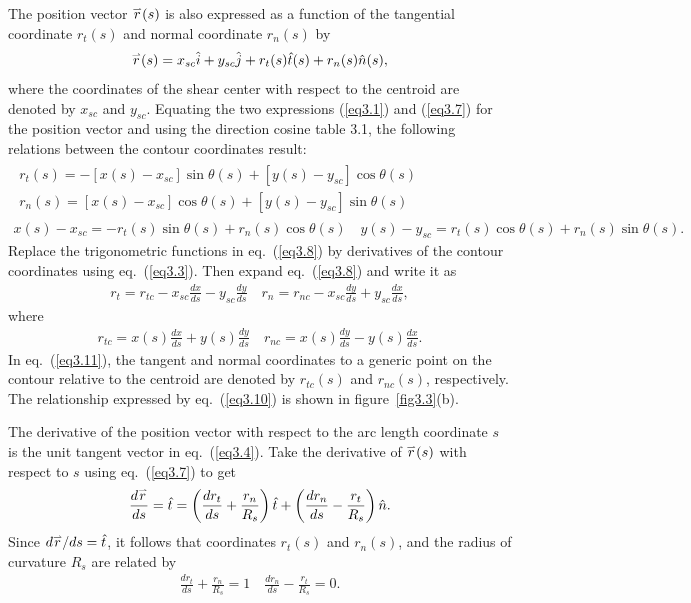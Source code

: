 \documentclass{AeroStructure-ERJohnson}
\def\harp#1{\smash{\mathord{\buildrel{\lower3pt\hbox{$\scriptscriptstyle\rightharpoonup$}}\over{#1}}}}
\begin{document}
The position vector $\harp{r}(s)$ is also expressed as a function of the tangential coordinate $r_{t}(s)$ and normal coordinate $r_{n}(s)$ by
\begin{align}\label{eq3.7}
\harp{r}(s)=x_{s c} \hat{i}+y_{sc} \hat{j}+r_{t}(s) \hat{t}(s)+r_{n}(s) \hat{n}(s),
\end{align}
where the coordinates of the shear center with respect to the centroid are denoted by $x_{s c}$ and $y_{s c}$. Equating the two expressions (\ref{eq3.1}) and (\ref{eq3.7}) for the position vector and using the direction cosine table 3.1, the following relations between the contour coordinates result:
\begin{gather}\label{eq3.8}
\begin{split}
r_{t}(s)=-\left[x(s)-x_{s c}\right] \sin \theta(s)+\left[y(s)-y_{s c}\right] \cos \theta(s) \\
r_{n}(s)=\left[x(s)-x_{s c}\right] \cos \theta(s)+\left[y(s)-y_{s c}\right] \sin \theta(s)
\end{split}\\
x(s)-x_{s c}=-r_{t}(s) \sin \theta(s)+r_{n}(s) \cos \theta(s) \quad y(s)-y_{s c}=r_{t}(s) \cos \theta(s)+r_{n}(s) \sin \theta(s).\label{eq3.9}
\end{gather}
Replace the trigonometric functions in eq.~(\ref{eq3.8}) by derivatives of the contour coordinates using eq.~(\ref{eq3.3}). Then expand eq.~(\ref{eq3.8}) and write it as
\begin{align}\label{eq3.10}
r_{t}=r_{t c}-x_{s c} \frac{d x}{d s}-y_{s c} \frac{d y}{d s} \quad r_{n}=r_{n c}-x_{s c} \frac{d y}{d s}+y_{s c} \frac{d x}{d s},
\end{align}
where
\begin{align}\label{eq3.11}
r_{t c}=x(s) \frac{d x}{d s}+y(s) \frac{d y}{d s} \quad r_{n c}=x(s) \frac{d y}{d s}-y(s) \frac{d x}{d s}.
\end{align}
In eq.~(\ref{eq3.11}), the tangent and normal coordinates to a generic point on the contour relative to the centroid are denoted by $r_{t c}(s)$ and $r_{n c}(s)$, respectively. The relationship expressed by eq.~(\ref{eq3.10}) is shown in figure~\ref{fig3.3}(b).

\clearpage

The derivative of the position vector with respect to the arc length coordinate $s$ is the unit tangent vector in eq.~(\ref{eq3.4}). Take the derivative of $\harp{r}(s)$ with respect to $s$ using eq.~(\ref{eq3.7}) to get
\begin{align}\label{eq3.12}
\frac{d \harp{r}}{d s}=\hat{t}=\left(\frac{d r_{t}}{d s}+\frac{r_{n}}{R_{s}}\right) \hat{t}+\left(\frac{d r_{n}}{d s}-\frac{r_{t}}{R_{s}}\right) \hat{n}.
\end{align}
Since $d \harp{r} / d s=\hat{t}$, it follows that coordinates $r_{t}(s)$ and $r_{n}(s)$, and the radius of curvature $R_{s}$ are related by
\begin{align}\label{eq3.13}
\frac{d r_{t}}{d s}+\frac{r_{n}}{R_{s}}=1 \quad \frac{d r_{n}}{d s}-\frac{r_{t}}{R_{s}}=0.
\end{align}
\end{document}
